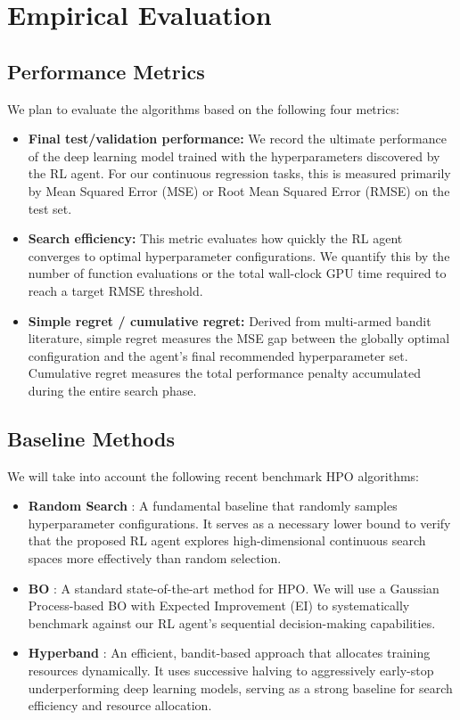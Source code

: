 \documentclass[12pt]{article}
\begin{document}
\section{Empirical Evaluation}

\subsection*{Performance Metrics}
We plan to evaluate the algorithms based on the following four metrics:
\begin{itemize}
    \item \textbf{Final test/validation performance:} We record the ultimate performance of the deep learning model trained with the hyperparameters discovered by the RL agent. For our continuous regression tasks, this is measured primarily by Mean Squared Error (MSE) or Root Mean Squared Error (RMSE) on the test set.
    \item \textbf{Search efficiency:} This metric evaluates how quickly the RL agent converges to optimal hyperparameter configurations. We quantify this by the number of function evaluations or the total wall-clock GPU time required to reach a target RMSE threshold.
    \item \textbf{Simple regret / cumulative regret:} Derived from multi-armed bandit literature, simple regret measures the MSE gap between the globally optimal configuration and the agent's final recommended hyperparameter set. Cumulative regret measures the total performance penalty accumulated during the entire search phase.
\end{itemize}

\subsection*{Baseline Methods}
We will take into account the following recent benchmark HPO algorithms:
\begin{itemize}
    \item \textbf{Random Search} \citep{bergstra2012random}: A fundamental baseline that randomly samples hyperparameter configurations. It serves as a necessary lower bound to verify that the proposed RL agent explores high-dimensional continuous search spaces more effectively than random selection.
    \item \textbf{BO} \citep{snoek2012practical}: A standard state-of-the-art method for HPO. We will use a Gaussian Process-based BO with Expected Improvement (EI) to systematically benchmark against our RL agent's sequential decision-making capabilities.
    \item \textbf{Hyperband} \citep{li2017hyperband}: An efficient, bandit-based approach that allocates training resources dynamically. It uses successive halving to aggressively early-stop underperforming deep learning models, serving as a strong baseline for search efficiency and resource allocation.
\end{itemize}
\end{document}

